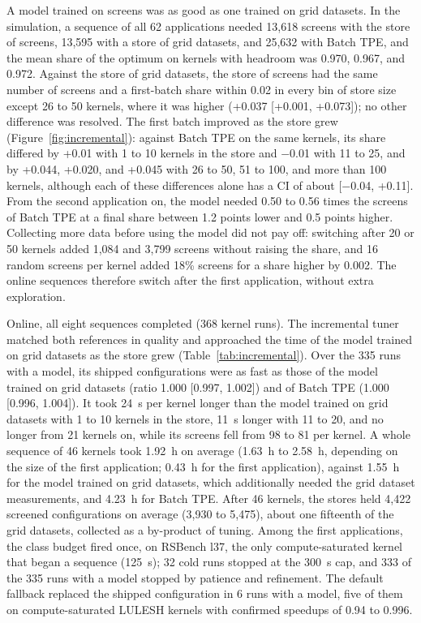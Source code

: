 \documentclass[10pt]{article}
\begin{document}
A model trained on screens was as good as one trained on grid datasets. In the
simulation, a sequence of all 62 applications needed 13{,}618 screens with the
store of screens, 13{,}595 with a store of grid datasets, and 25{,}632 with Batch
TPE, and the mean share of the optimum on kernels with headroom was 0.970, 0.967,
and 0.972. Against the store of grid datasets, the store of screens had the same
number of screens and a first-batch share within 0.02 in every bin of store
size except 26 to 50 kernels, where it was higher (+0.037 [+0.001, +0.073]);
no other difference was resolved.
The first batch improved as the store grew (Figure~\ref{fig:incremental}): against
Batch TPE on the same kernels, its share differed by +0.01 with 1 to 10 kernels in
the store and $-$0.01 with 11 to 25, and by +0.044, +0.020, and +0.045 with 26 to
50, 51 to 100, and more than 100 kernels, although each of these differences alone
has a CI of about [$-$0.04, +0.11]. From the second application on, the model
needed 0.50 to 0.56 times the screens of Batch TPE at a final share between 1.2
points lower and 0.5 points higher. Collecting more data before using the model did not pay off:
switching after 20 or 50 kernels added 1{,}084 and 3{,}799 screens without raising
the share, and 16 random screens per kernel added 18\% screens for a share higher
by 0.002. The online sequences therefore switch after the first application,
without extra exploration.

Online, all eight sequences completed (368 kernel runs). The incremental tuner
matched both references in quality and approached the time of the model trained
on grid datasets as the store grew (Table~\ref{tab:incremental}). Over the 335 runs
with a model, its shipped configurations were as fast as those of the model
trained on grid datasets (ratio 1.000 [0.997, 1.002]) and of Batch TPE (1.000
[0.996, 1.004]). It took 24~s per kernel longer than the model trained on
grid datasets with 1 to 10 kernels in the store, 11~s longer with 11 to 20, and no
longer from 21 kernels on, while its screens fell from 98 to 81 per kernel. A
whole sequence of 46 kernels took 1.92~h on average (1.63~h to 2.58~h,
depending on the size of the first application; 0.43~h for the first
application), against 1.55~h for the model trained on grid datasets, which
additionally needed the grid dataset measurements, and 4.23~h for Batch TPE. After
46 kernels, the stores held 4{,}422 screened configurations on average (3{,}930
to 5{,}475), about one fifteenth of the grid datasets, collected as a by-product of
tuning. Among the first applications, the class budget fired once, on RSBench
l37, the only compute-saturated kernel that began a sequence (125~s); 32 cold
runs stopped at the 300~s cap, and 333 of the 335 runs with a model stopped by
patience and refinement. The default fallback replaced the shipped configuration
in 6 runs with a model, five of them on compute-saturated LULESH kernels with
confirmed speedups of 0.94 to 0.996.
\end{document}
